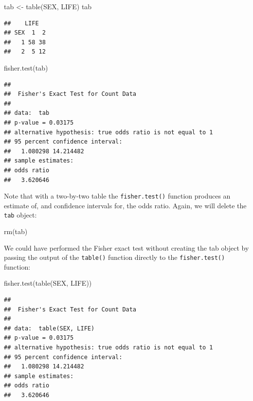 \documentclass[
  12pt,
]{book}
\newenvironment{Shaded}{\begin{snugshade}}{\end{snugshade}}
\newcommand{\FunctionTok}[1]{\textcolor[rgb]{0.00,0.00,0.00}{#1}}
\newcommand{\NormalTok}[1]{#1}
\newcommand{\OtherTok}[1]{\textcolor[rgb]{0.56,0.35,0.01}{#1}}
\begin{document}
\begin{Shaded}
\begin{Highlighting}[]
\NormalTok{tab }\OtherTok{\textless{}{-}} \FunctionTok{table}\NormalTok{(SEX, LIFE)}
\NormalTok{tab}
\end{Highlighting}
\end{Shaded}

\begin{verbatim}
##    LIFE
## SEX  1  2
##   1 58 38
##   2  5 12
\end{verbatim}

\begin{Shaded}
\begin{Highlighting}[]
\FunctionTok{fisher.test}\NormalTok{(tab)}
\end{Highlighting}
\end{Shaded}

\begin{verbatim}
## 
##  Fisher's Exact Test for Count Data
## 
## data:  tab
## p-value = 0.03175
## alternative hypothesis: true odds ratio is not equal to 1
## 95 percent confidence interval:
##   1.080298 14.214482
## sample estimates:
## odds ratio 
##   3.620646
\end{verbatim}

\newpage

Note that with a two-by-two table the \texttt{fisher.test()} function produces an estimate of, and confidence intervals for, the odds ratio. Again, we will delete the \texttt{tab} object:

\begin{Shaded}
\begin{Highlighting}[]
\FunctionTok{rm}\NormalTok{(tab)}
\end{Highlighting}
\end{Shaded}

We could have performed the Fisher exact test without creating the tab object by passing the output of the \texttt{table()} function directly to the \texttt{fisher.test()} function:

\begin{Shaded}
\begin{Highlighting}[]
\FunctionTok{fisher.test}\NormalTok{(}\FunctionTok{table}\NormalTok{(SEX, LIFE))}
\end{Highlighting}
\end{Shaded}

\begin{verbatim}
## 
##  Fisher's Exact Test for Count Data
## 
## data:  table(SEX, LIFE)
## p-value = 0.03175
## alternative hypothesis: true odds ratio is not equal to 1
## 95 percent confidence interval:
##   1.080298 14.214482
## sample estimates:
## odds ratio 
##   3.620646
\end{verbatim}
\end{document}
